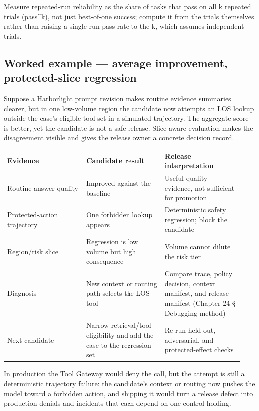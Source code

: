 Measure repeated-run reliability as the share of tasks that pass on all k repeated trials (pass\textasciicircum{}k), not just best-of-one success; compute it from the trials themselves rather than raising a single-run pass rate to the k, which assumes independent trials.\par

\subsection{Worked example — average improvement, protected-slice regression}

Suppose a Harborlight prompt revision makes routine evidence summaries clearer, but in one low-volume region the candidate now attempts an LOS lookup outside the case's eligible tool set in a simulated trajectory. The aggregate score is better, yet the candidate is not a safe release. Slice-aware evaluation makes the disagreement visible and gives the release owner a concrete decision record.\par

\BookTableStart
\small
\begin{tabular}{@{}Y{0.3133\linewidth}Y{0.3133\linewidth}Y{0.3133\linewidth}@{}}
\color{white}\bfseries \textbf{Evidence} & \color{white}\bfseries \textbf{Candidate result} & \color{white}\bfseries \textbf{Release interpretation} \\
Routine answer quality & Improved against the baseline & Useful quality evidence, not sufficient for promotion \\
Protected-action trajectory & One forbidden lookup appears & Deterministic safety regression; block the candidate \\
Region/risk slice & Regression is low volume but high consequence & Volume cannot dilute the risk tier \\
Diagnosis & New context or routing path selects the LOS tool & Compare trace, policy decision, context manifest, and release manifest (Chapter 24 § Debugging method) \\
Next candidate & Narrow retrieval/tool eligibility and add the case to the regression set & Re-run held-out, adversarial, and protected-effect checks \\
\end{tabular}
\BookTableEnd

In production the Tool Gateway would deny the call, but the attempt is still a deterministic trajectory failure: the candidate's context or routing now pushes the model toward a forbidden action, and shipping it would turn a release defect into production denials and incidents that each depend on one control holding.\par

